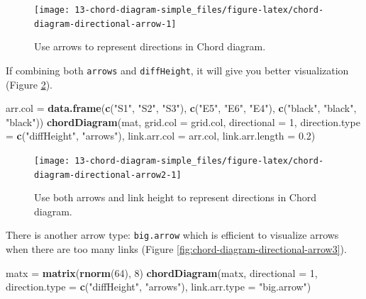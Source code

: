 \documentclass[]{book}
\newenvironment{Shaded}{\begin{snugshade}}{\end{snugshade}}
\newcommand{\KeywordTok}[1]{\textcolor[rgb]{0.13,0.29,0.53}{\textbf{#1}}}
\newcommand{\DataTypeTok}[1]{\textcolor[rgb]{0.13,0.29,0.53}{#1}}
\newcommand{\DecValTok}[1]{\textcolor[rgb]{0.00,0.00,0.81}{#1}}
\newcommand{\FloatTok}[1]{\textcolor[rgb]{0.00,0.00,0.81}{#1}}
\newcommand{\StringTok}[1]{\textcolor[rgb]{0.31,0.60,0.02}{#1}}
\newcommand{\NormalTok}[1]{#1}
\begin{document}
\begin{figure}

{\centering \texttt{[image: 13-chord-diagram-simple\_files/figure-latex/chord-diagram-directional-arrow-1]} 

}

\caption{Use arrows to represent directions in Chord diagram.}\label{fig:chord-diagram-directional-arrow}
\end{figure}

If combining both \texttt{arrows} and \texttt{diffHeight}, it will give
you better visualization (Figure
\ref{fig:chord-diagram-directional-arrow2}).

\begin{Shaded}
\begin{Highlighting}[]
\NormalTok{arr.col =}\StringTok{ }\KeywordTok{data.frame}\NormalTok{(}\KeywordTok{c}\NormalTok{(}\StringTok{"S1"}\NormalTok{, }\StringTok{"S2"}\NormalTok{, }\StringTok{"S3"}\NormalTok{), }\KeywordTok{c}\NormalTok{(}\StringTok{"E5"}\NormalTok{, }\StringTok{"E6"}\NormalTok{, }\StringTok{"E4"}\NormalTok{), }
    \KeywordTok{c}\NormalTok{(}\StringTok{"black"}\NormalTok{, }\StringTok{"black"}\NormalTok{, }\StringTok{"black"}\NormalTok{))}
\KeywordTok{chordDiagram}\NormalTok{(mat, }\DataTypeTok{grid.col =}\NormalTok{ grid.col, }\DataTypeTok{directional =} \DecValTok{1}\NormalTok{, }
    \DataTypeTok{direction.type =} \KeywordTok{c}\NormalTok{(}\StringTok{"diffHeight"}\NormalTok{, }\StringTok{"arrows"}\NormalTok{),}
    \DataTypeTok{link.arr.col =}\NormalTok{ arr.col, }\DataTypeTok{link.arr.length =} \FloatTok{0.2}\NormalTok{)}
\end{Highlighting}
\end{Shaded}

\begin{figure}

{\centering \texttt{[image: 13-chord-diagram-simple\_files/figure-latex/chord-diagram-directional-arrow2-1]} 

}

\caption{Use both arrows and link height to represent directions in Chord diagram.}\label{fig:chord-diagram-directional-arrow2}
\end{figure}

There is another arrow type: \texttt{big.arrow} which is efficient to
visualize arrows when there are too many links (Figure
\ref{fig:chord-diagram-directional-arrow3}).

\begin{Shaded}
\begin{Highlighting}[]
\NormalTok{matx =}\StringTok{ }\KeywordTok{matrix}\NormalTok{(}\KeywordTok{rnorm}\NormalTok{(}\DecValTok{64}\NormalTok{), }\DecValTok{8}\NormalTok{)}
\KeywordTok{chordDiagram}\NormalTok{(matx, }\DataTypeTok{directional =} \DecValTok{1}\NormalTok{, }\DataTypeTok{direction.type =} \KeywordTok{c}\NormalTok{(}\StringTok{"diffHeight"}\NormalTok{, }\StringTok{"arrows"}\NormalTok{),}
    \DataTypeTok{link.arr.type =} \StringTok{"big.arrow"}\NormalTok{)}
\end{Highlighting}
\end{Shaded}
\end{document}

